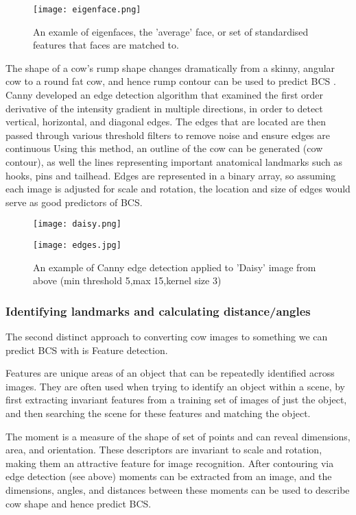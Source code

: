 \documentclass[11pt]{article}
\begin{document}
	\begin{figure}[b!]
		\centering
		\texttt{[image: eigenface.png]}
		\caption{An examle of eigenfaces, the 'average' face, or set of standardised features that faces are matched to.}
		\label{fig:<+label+>}
	\end{figure}
\newpage

The shape of a cow's rump shape changes dramatically from a skinny, angular cow to a round fat cow, and hence rump contour can be used to predict BCS \cite{Halachmi2008}.
	Canny developed an edge detection algorithm that examined the first order derivative of the intensity gradient in multiple directions, in order to detect vertical, horizontal, and diagonal edges\cite{Canny1986}.
	The edges that are located are then passed through various threshold filters to remove noise and ensure edges are continuous
	Using this method, an outline of the cow can be generated (cow contour), as well the lines representing important anatomical landmarks such as hooks, pins and tailhead.
	Edges are represented in a binary array, so assuming each image is adjusted for scale and rotation, the location and size of edges would serve as good predictors of BCS.


	\begin{figure}[h!]
		\centering
		\parbox{5cm}{\texttt{[image: daisy.png]}}
		\parbox{6cm}{\texttt{[image: edges.jpg]}}
		\caption{An example of Canny edge detection applied to 'Daisy' image from above (min threshold 5,max 15,kernel size 3) }
		\label{fig:}
	\end{figure}
\newpage


	\subsubsection{Identifying landmarks and calculating distance/angles}

	The second distinct approach to converting cow images to something we can predict BCS with is Feature detection.


	Features are unique areas of an object that can be repeatedly identified across images.
	They are often used when trying to identify an object within a scene, by first extracting invariant features from a training set of images of just the object, and then searching the scene for these features and matching the object.


	The moment is a measure of the shape of set of points and can reveal dimensions, area, and orientation. 
	These descriptors are invariant to scale and rotation, making them an attractive feature for image recognition.
	After contouring via edge detection (see above) moments can be extracted from an image, and the dimensions, angles, and distances between these moments can be used to describe cow shape and hence predict BCS.
\end{document}

